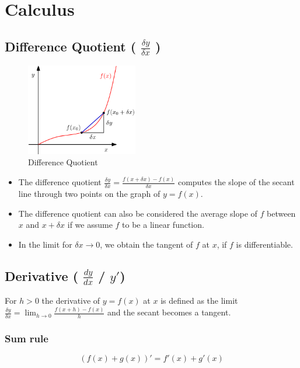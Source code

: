 \chapter{Calculus}

\section{Difference Quotient ( $\displaystyle\frac{\delta y}{\delta x}$ )}\label{Difference Quotient}

\begin{figure}[H]
    \centering
    \includegraphics[height=4cm]{Pictures/maths/Difference Quotient.png}
    \caption{Difference Quotient}
\end{figure}

\begin{itemize}
    \item The difference quotient \( \displaystyle\frac{\delta y}{\delta x} = \displaystyle\frac{f(x + \delta x) - f(x)}{\delta x} \) computes the slope of the secant line through two points on the graph of $y = f(x)$. 
    \item The difference quotient can also be considered the average slope of $f$ between $x$ and $x + \delta x$ if we assume $f$ to be a linear function. 
    \item In the limit for $\delta x \rightarrow 0$, we obtain the tangent of $f$ at $x$, if $f$ is differentiable.
\end{itemize}

\section{Derivative ( $\displaystyle\frac{dy}{dx}$ / $y'$)}\label{Derivative}

For $h > 0$ the derivative of $y = f(x)$ at $x$ is defined as the limit \( \displaystyle\frac{\delta y}{\delta x} = \lim_{h\rightarrow 0}\displaystyle\frac{f(x + h) - f(x)}{h} \) and the secant becomes a tangent.

\subsection{Sum rule}
\[
    (f(x) + g(x))' = f'(x) + g'(x)
\]


